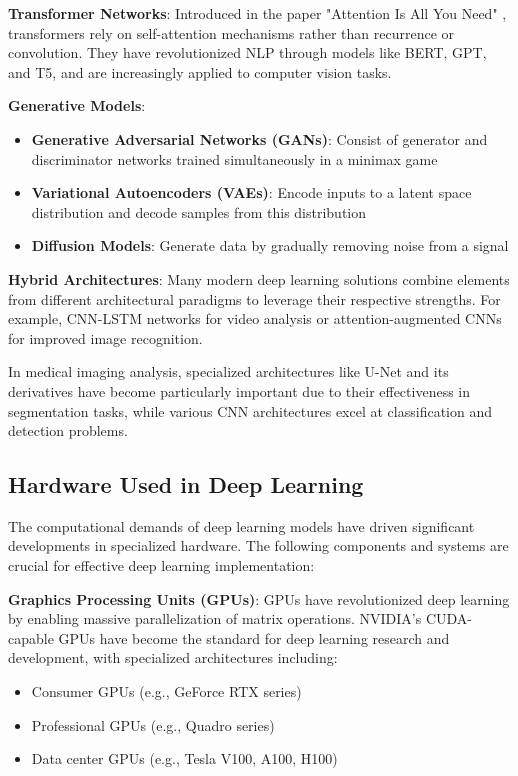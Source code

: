 \textbf{Transformer Networks}:
Introduced in the paper "Attention Is All You Need" \cite{vaswani2017attention}, transformers rely on self-attention mechanisms rather than recurrence or convolution. They have revolutionized NLP through models like BERT, GPT, and T5, and are increasingly applied to computer vision tasks.

\textbf{Generative Models}:
\begin{itemize}
  \item \textbf{Generative Adversarial Networks (GANs)}: Consist of generator and discriminator networks trained simultaneously in a minimax game \cite{goodfellow2014generative}
  \item \textbf{Variational Autoencoders (VAEs)}: Encode inputs to a latent space distribution and decode samples from this distribution \cite{kingma2013auto}
  \item \textbf{Diffusion Models}: Generate data by gradually removing noise from a signal \cite{ho2020denoising}
\end{itemize}

\textbf{Hybrid Architectures}:
Many modern deep learning solutions combine elements from different architectural paradigms to leverage their respective strengths. For example, CNN-LSTM networks for video analysis or attention-augmented CNNs for improved image recognition.

In medical imaging analysis, specialized architectures like U-Net and its derivatives have become particularly important due to their effectiveness in segmentation tasks, while various CNN architectures excel at classification and detection problems.

\subsection{Hardware Used in Deep Learning}
\label{sec:dl_hardware}
The computational demands of deep learning models have driven significant developments in specialized hardware. The following components and systems are crucial for effective deep learning implementation:

\textbf{Graphics Processing Units (GPUs)}:
GPUs have revolutionized deep learning by enabling massive parallelization of matrix operations. NVIDIA's CUDA-capable GPUs have become the standard for deep learning research and development, with specialized architectures including:
\begin{itemize}
  \item Consumer GPUs (e.g., GeForce RTX series)
  \item Professional GPUs (e.g., Quadro series)
  \item Data center GPUs (e.g., Tesla V100, A100, H100)
\end{itemize}

